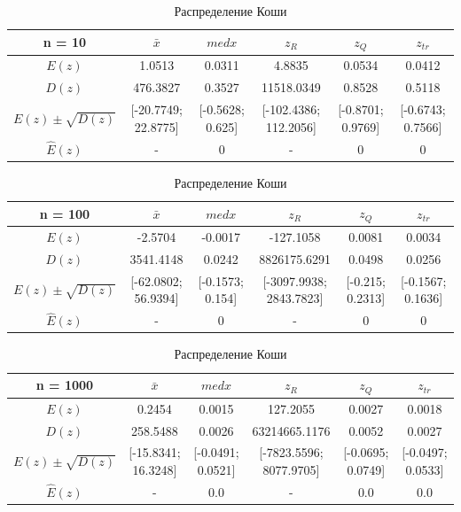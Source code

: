 \documentclass[12pt]{article}
\begin{document}
\begin{center}
\begin{table}[!hbt]
\end{table}
\begin{table}[ht]
\caption{Распределение Коши}
\begin{adjustbox}{width=\textwidth}
\begin{tabular}{| c | c | c | c | c | c |}
\hline
n = 10 & $\bar{x}$ & $med x$ & $z_R$ & $z_Q$ & $z_{tr}$ \\\hline
$E(z)$ & 1.0513 & 0.0311 & 4.8835 & 0.0534 & 0.0412 \\\hline
$D(z)$ & 476.3827 & 0.3527 & 11518.0349 & 0.8528 & 0.5118 \\\hline
$E(z) \pm \sqrt{D(z)}$ & [-20.7749; 22.8775] & [-0.5628; 0.625] & [-102.4386; 112.2056] & [-0.8701; 0.9769] & [-0.6743; 0.7566]\\\hline
$\hat{E}(z)$ & - & 0 & - & 0 & 0 \\\hline
\end{tabular}
\end{adjustbox}

\begin{adjustbox}{width=\textwidth}
\begin{tabular}{| c | c | c | c | c | c |}
\hline
n = 100 & $\bar{x}$ & $med x$ & $z_R$ & $z_Q$ & $z_{tr}$ \\\hline
$E(z)$ & -2.5704 & -0.0017 & -127.1058 & 0.0081 & 0.0034 \\\hline
$D(z)$ & 3541.4148 & 0.0242 & 8826175.6291 & 0.0498 & 0.0256 \\\hline
$E(z) \pm \sqrt{D(z)}$ & [-62.0802; 56.9394] & [-0.1573; 0.154] & [-3097.9938; 2843.7823] & [-0.215; 0.2313] & [-0.1567; 0.1636]\\\hline
$\hat{E}(z)$ & - & 0 & - & 0 & 0 \\\hline
\end{tabular}
\end{adjustbox}

\begin{adjustbox}{width=\textwidth}
\begin{tabular}{| c | c | c | c | c | c |}
\hline
n = 1000 & $\bar{x}$ & $med x$ & $z_R$ & $z_Q$ & $z_{tr}$ \\\hline
$E(z)$ & 0.2454 & 0.0015 & 127.2055 & 0.0027 & 0.0018 \\\hline
$D(z)$ & 258.5488 & 0.0026 & 63214665.1176 & 0.0052 & 0.0027 \\\hline
$E(z) \pm \sqrt{D(z)}$ & [-15.8341; 16.3248] & [-0.0491; 0.0521] & [-7823.5596; 8077.9705] & [-0.0695; 0.0749] & [-0.0497; 0.0533]
\\\hline
$\hat{E}(z)$ & - & 0.0 & - & 0.0 & 0.0 \\\hline
\end{tabular}
\end{adjustbox}


\end{table}
\end{center}
\end{document}
